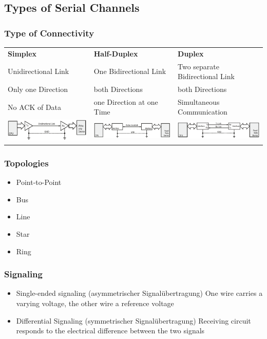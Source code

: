 \subsection{Types of Serial Channels }
\subsubsection{Type of Connectivity}
\begin{tabular}{lll}
	\textbf{Simplex}&\textbf{Half-Duplex} &\textbf{Duplex}\\
	Unidirectional Link&  One Bidirectional Link& Two separate Bidirectional Link\\
	Only one Direction & both Directions & both Directions\\
	No ACK of Data & one Direction at one Time & Simultaneous Communication\\
	\includegraphics[width=6cm]{images/simplex.png}& \includegraphics[width=6cm]{images/half_duplex.png}&
	\includegraphics[width=6cm]{images/duplex.png}\\
\end{tabular}
\begin{multicols}{2}
	\subsubsection{Topologies}
	\begin{itemize}
		\item Point-to-Point
		\item Bus
		\item Line
		\item Star
		\item Ring
	\end{itemize}
	\subsubsection{Signaling}
	\begin{itemize}
		\item Single-ended signaling (asymmetrischer Signalübertragung)
		\subitem One wire carries a varying voltage, the other wire a reference voltage
		\item Differential Signaling (symmetrischer Signalübertragung)
		\subitem Receiving circuit responds to the electrical difference between the two signals
	\end{itemize}
\end{multicols}
	
